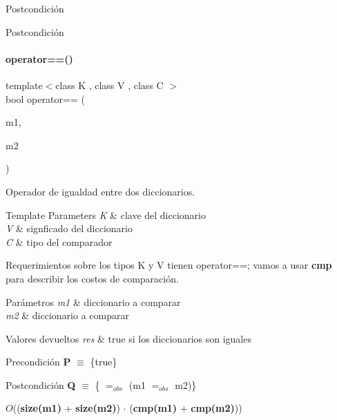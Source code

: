 \begin{DoxyPostcond}{\-Postcondición}
\begin{DoxyPostcond}{\-Postcondición}
\paragraph{\texorpdfstring{operator==()}{operator==()}}
{\footnotesize\ttfamily template$<$class K , class V , class C $>$ \\
bool operator== (\begin{DoxyParamCaption}\item[{const \hyperlink{classaed2_1_1map}{map}$<$ K, V, C $>$ \&}]{m1,  }\item[{const \hyperlink{classaed2_1_1map}{map}$<$ K, V, C $>$ \&}]{m2 }\end{DoxyParamCaption})\hspace{0.3cm}{\ttfamily [related]}}



Operador de igualdad entre dos diccionarios. 


\begin{DoxyTemplParams}{Template Parameters}
{\em K} & clave del diccionario \\
\hline
{\em V} & signficado del diccionario \\
\hline
{\em C} & tipo del comparador\\
\hline
\end{DoxyTemplParams}
\begin{DoxyParagraph}{Requerimientos sobre los tipos}
K y V tienen operator==; vamos a usar {\bfseries cmp} para describir los costos de comparación.
\end{DoxyParagraph}

\begin{DoxyParams}{Parámetros}
{\em m1} & diccionario a comparar \\
\hline
{\em m2} & diccionario a comparar \\
\hline
\end{DoxyParams}

\begin{DoxyRetVals}{Valores devueltos}
{\em res} & true si los diccionarios son iguales\\
\hline
\end{DoxyRetVals}
\begin{DoxyPrecond}{Precondición}
{\bfseries P} $\equiv$ \{true\} 
\end{DoxyPrecond}
\begin{DoxyPostcond}{Postcondición}
{\bfseries Q} $\equiv$ \{ $=_{obs}$ (m1 $=_{obs}$ m2)\}
\end{DoxyPostcond}

\begin{DoxyDescription}
\item[Complejidad Temporal]$O$(({\bfseries size(m1)} + {\bfseries size(m2)}) $\cdot$ ({\bfseries cmp(m1)} + {\bfseries cmp(m2)}))
\end{DoxyDescription}


\end{DoxyPostcond}
\end{DoxyPostcond}
